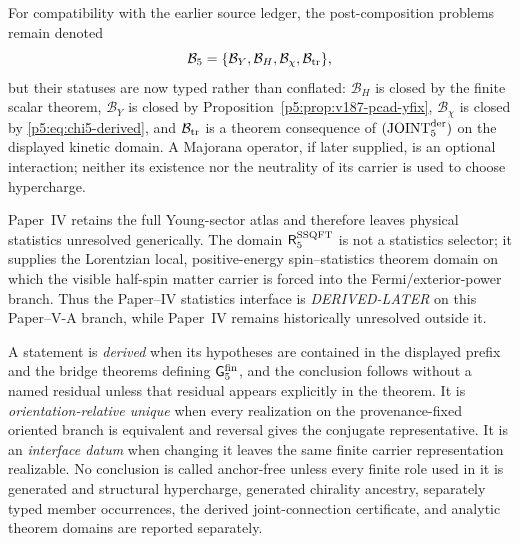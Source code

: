 \documentclass[12pt,a4paper]{article}
\begin{document}
\begin{definition}
For compatibility with the earlier source ledger, the post-composition
problems remain denoted
\begin{equation}
\label{p5:eq:completion-obligation-packet}
\mathcal B_5=\{\mathcal B_Y,\mathcal B_H,\mathcal B_\chi,\mathcal B_{\rm tr}\},
\end{equation}
but their statuses are now typed rather than conflated:
\(\mathcal B_H\) is closed by the finite scalar theorem,
\(\mathcal B_Y\) is closed by Proposition~\ref{p5:prop:v187-pcad-yfix},
\(\mathcal B_\chi\) is closed by \eqref{p5:eq:chi5-derived}, and
\(\mathcal B_{\rm tr}\) is a theorem consequence of
\(({\rm JOINT}_5^{\rm der})\) on the displayed kinetic domain.  A Majorana
operator, if later supplied, is an optional interaction; neither its existence
nor the neutrality of its carrier is used to choose hypercharge.
\end{definition}

\begin{remark}
\label{p5:rem:statistics-derived-later}
Paper~IV retains the full Young-sector atlas and therefore leaves physical
statistics unresolved generically.  The domain \(\mathsf R_5^{\rm SSQFT}\)
is not a statistics selector; it supplies the Lorentzian local,
positive-energy spin--statistics theorem domain on which the visible
half-spin matter carrier is forced into the Fermi/exterior-power branch.
Thus the Paper--IV statistics interface is \emph{DERIVED-LATER} on this
Paper--V-A branch, while Paper~IV remains historically unresolved outside it.
\end{remark}

\begin{definition}
\label{p5:post:structural-criterion}
\label{p5:def:structural-criterion}
A statement is \emph{derived} when its hypotheses are contained in the
displayed prefix and the bridge theorems defining
\(\mathsf G_5^{\rm fin}\), and the conclusion follows without a named
residual unless that residual appears explicitly in the theorem.  It is
\emph{orientation-relative unique} when every
realization on the provenance-fixed oriented branch is equivalent and reversal gives
the conjugate representative.  It is an \emph{interface datum} when changing
it leaves the same finite carrier representation realizable.  No conclusion
is called anchor-free unless every finite role used in it is generated and
structural hypercharge, generated chirality ancestry, separately typed member
occurrences, the derived joint-connection certificate, and analytic theorem
domains are reported separately.
\end{definition}
\end{document}

